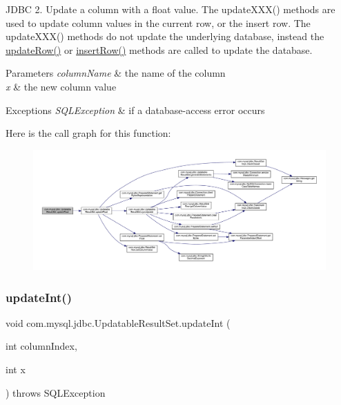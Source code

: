J\+D\+BC 2. Update a column with a float value. The update\+X\+X\+X() methods are used to update column values in the current row, or the insert row. The update\+X\+X\+X() methods do not update the underlying database, instead the \mbox{\hyperlink{classcom_1_1mysql_1_1jdbc_1_1_updatable_result_set_a919969ba4b3c7cbc7b18605e9f31a746}{update\+Row()}} or \mbox{\hyperlink{classcom_1_1mysql_1_1jdbc_1_1_updatable_result_set_aef041f8d9d0778083716fc26652648fa}{insert\+Row()}} methods are called to update the database.


\begin{DoxyParams}{Parameters}
{\em column\+Name} & the name of the column \\
\hline
{\em x} & the new column value\\
\hline
\end{DoxyParams}

\begin{DoxyExceptions}{Exceptions}
{\em S\+Q\+L\+Exception} & if a database-\/access error occurs \\
\hline
\end{DoxyExceptions}
Here is the call graph for this function\+:
\nopagebreak
\begin{figure}[H]
\begin{center}
\leavevmode
\includegraphics[width=350pt]{classcom_1_1mysql_1_1jdbc_1_1_updatable_result_set_a530db511bea6cfb6177fad010a3aa32a_cgraph}
\end{center}
\end{figure}
\mbox{\label{classcom_1_1mysql_1_1jdbc_1_1_updatable_result_set_a888635ba4ba026167fe0d1ba6a0739d0}} 
\subsubsection{\texorpdfstring{update\+Int()}{updateInt()}\hspace{0.1cm}{\footnotesize\ttfamily [1/2]}}
{\footnotesize\ttfamily void com.\+mysql.\+jdbc.\+Updatable\+Result\+Set.\+update\+Int (\begin{DoxyParamCaption}\item[{int}]{column\+Index,  }\item[{int}]{x }\end{DoxyParamCaption}) throws S\+Q\+L\+Exception}

